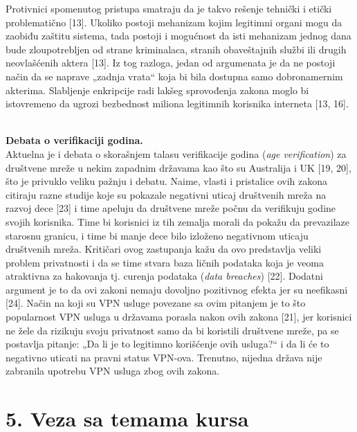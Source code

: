 \documentclass[
]{article}
\begin{document}
Protivnici spomenutog pristupa smatraju da je takvo rešenje tehnički i etički
problematično [13]. Ukoliko postoji mehanizam kojim legitimni organi
mogu da zaobiđu zaštitu sistema, tada postoji i mogućnost da isti
mehanizam jednog dana bude zloupotrebljen od strane kriminalaca, stranih
obaveštajnih službi ili drugih neovlašćenih aktera [13]. Iz tog
razloga, jedan od argumenata je da ne postoji način da se naprave
„zadnja vrata`` koja bi bila dostupna samo dobronamernim akterima.
Slabljenje enkripcije radi lakšeg sprovođenja zakona moglo bi
istovremeno da ugrozi bezbednost miliona legitimnih korisnika interneta
[13, 16].\\
\strut \\
\textbf{Debata o verifikaciji godina.}\\
Aktuelna je i debata o skorašnjem talasu verifikacije godina (\emph{age verification}) za društvene mreže u nekim zapadnim državama kao što su
Australija i UK [19, 20], što je privuklo veliku pažnju i debatu.
Naime, vlasti i pristalice ovih zakona citiraju razne studije koje su
pokazale negativni uticaj društvenih mreža na razvoj dece [23] i
time apeluju da društvene mreže počnu da verifikuju godine svojih
korisnika. Time bi korisnici iz tih zemalja morali da pokažu da
prevazilaze starosnu granicu, i time bi manje dece bilo izloženo
negativnom uticaju društvenih mreža. Kritičari ovog zastupanja kažu da
ovo predstavlja veliki problem privatnosti i da se time stvara baza
ličnih podataka koja je veoma atraktivna za hakovanja tj. curenja podataka (\emph{data breaches}) [22]. Dodatni argument je to da ovi zakoni nemaju
dovoljno pozitivnog efekta jer su neefikasni [24]. Način na koji su
VPN usluge povezane sa ovim pitanjem je to što popularnost VPN usluga u
državama porasla nakon ovih zakona [21], jer korisnici ne žele da
rizikuju svoju privatnost samo da bi koristili društvene mreže, pa se
postavlja pitanje: „Da li je to legitimno korišćenje ovih usluga?{}`` i
da li će to negativno uticati na pravni status VPN-ova. Trenutno,
nijedna država nije zabranila upotrebu VPN usluga zbog ovih zakona.

\section{5. Veza sa temama kursa}
\label{sec:t5}
\end{document}
